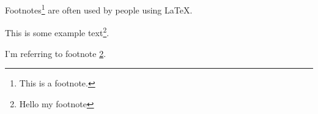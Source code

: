 \documentclass[12pt]{article}
\begin{document}
	Footnotes\footnote{This is a footnote.} are often used by people using \LaTeX.
	\newline

	This is some example text\footnote{\label{myfootnote}Hello my footnote}. 
	
	I'm referring to footnote \ref{myfootnote}.
	
\end{document}
